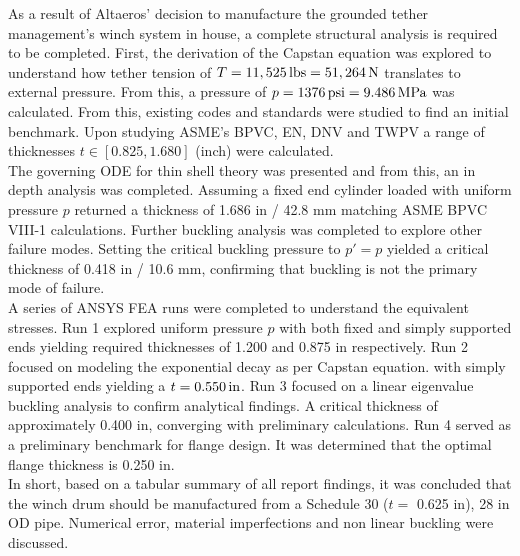 As a result of Altaeros' decision to manufacture the grounded tether management's winch system in house, a complete structural analysis is required to be completed. First, the derivation of the Capstan equation was explored to understand how tether tension of $T=11,525 \,\mathrm{lbs} = 51,264\,\mathrm{N}$ translates to external pressure. From this, a pressure of $p=1376\,\mathrm{psi}= 9.486\,\mathrm{MPa}$ was calculated. From this, existing codes and standards were studied to find an initial benchmark. Upon studying ASME's BPVC, EN, DNV and TWPV a range of thicknesses $t\in [0.825, 1.680]$ (inch) were calculated. \\

The governing ODE for thin shell theory was presented and from this, an in depth analysis was completed. Assuming a fixed end cylinder loaded with uniform pressure $p$ returned a thickness of 1.686 in / 42.8 mm matching ASME BPVC VIII-1 calculations. Further buckling analysis was completed to explore other failure modes. Setting the critical buckling pressure to $p'=p$ yielded a critical thickness  of 0.418 in / 10.6 mm, confirming that buckling is not the primary mode of failure.\\

A series of ANSYS FEA runs were completed to understand the equivalent stresses. Run 1 explored uniform pressure $p$ with both fixed and simply supported ends yielding required thicknesses of 1.200 and 0.875 in respectively. Run 2 focused on modeling the exponential decay as per Capstan equation. with simply supported ends yielding a $t=0.550\,\mathrm{in}$. Run 3 focused on a linear eigenvalue buckling analysis to confirm analytical findings. A critical thickness of approximately 0.400 in, converging with preliminary calculations. Run 4 served as a preliminary benchmark for flange design. It was determined that the optimal flange thickness is 0.250 in.\\

In short, based on a tabular summary of all report findings, it was concluded that the winch drum should be manufactured from a Schedule 30 ($t=$ 0.625 in), 28 in OD pipe. Numerical error, material imperfections and non linear buckling were discussed.
